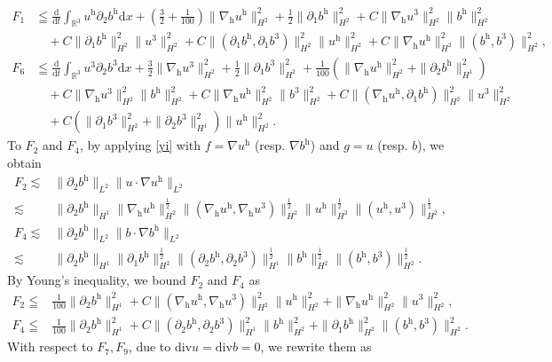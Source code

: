 \documentclass[11pt]{amsart}
\theoremstyle{definition}
\newcommand{\R}{\mathbb{R}}
\newcommand{\h}{\mathrm{h}}
\newcommand{\nablah}{\nabla_{\mathrm{h}}}
\numberwithin{equation}{section}
\begin{document}
\begin{align}\label{F1}
	F_1&\leqq\frac{\mathrm{d}}{\mathrm{d} t}\int_{\R^3} u^\h\partial_2 b^\h\mathrm{d} x+(\frac32+\frac{1}{100})\|\nablah u^\h\|_{H^2}^2+\frac12\|\partial_1 b^\h\|_{H^2}^2+C\|\nablah u^3\|_{H^2}^2\|b^\h\|_{H^2}^2\nonumber\\
	&\quad+C\|\partial_1 b^\h\|_{H^2}^2\| u^3\|_{H^2}^2+C\|(\partial_1b^\h,\partial_1b^3)\|_{H^2}^2\| u^\h\|_{H^2}^2+C\|\nablah u^\h\|_{H^2}^2\|(b^\h,b^3)\|_{H^2}^2,\\\label{F6}
	F_6&\leqq\frac{\mathrm{d}}{\mathrm{d} t}\int_{\R^3}u^3\partial_2 b^3\mathrm{d} x+\frac32\|\nablah u^3\|_{H^2}^2+\frac12\|\partial_1 b^3\|_{H^2}^2+\frac{1}{100}\left( \|\nablah u^\h\|_{H^2}^2+\|\partial_2 b^\h\|_{H^1}^2\right)\nonumber\\
	&\quad+C\|\nabla_\h u^3\|_{H^2}^2\|b^\h\|_{H^2}^2+C\|\nabla_\h u^\h\|_{H^2}^2\|b^3\|_{H^2}^2+C\|(\nablah u^\h,\partial_1 b^\h)\|_{H^2}^2\|u^3\|_{H^2}^2\nonumber\\
	&\quad+C\left(\|\partial_1 b^3\|_{H^2}^2+\|\partial_2 b^3\|_{H^1}^2\right)\|u^\h\|_{H^2}^2.
\end{align}
To $F_2$ and $F_4$, by applying \eqref{yi} with $f=\nabla u^\h$ (resp. $\nabla b^\h$) and $g=u$ (resp. $b$), we obtain
\begin{align}\label{f_2}
	F_2\lesssim &\|\partial_2 b^\h\|_{L^2}\|u\cdot \nabla u^\h\|_{L^2}\nonumber\\
	\lesssim &\|\partial_2 b^\h\|_{H^1}\|\nablah u^\h\|_{H^2}^\frac12\|(\nablah u^\h,\nablah u^3)\|_{H^2}^\frac12\| u^\h\|_{H^2}^\frac12\|( u^\h, u^3)\|_{H^2}^\frac12,\\
	\label{f_4}
	F_4\lesssim &\|\partial_2 b^\h\|_{L^2}\|b\cdot \nabla b^\h\|_{L^2}\nonumber\\
	\lesssim &\|\partial_2 b^\h\|_{H^1}\|\partial_1 b^\h\|_{H^2}^\frac12\|(\partial_2 b^\h,\partial_2 b^3)\|_{H^1}^\frac12\| b^\h\|_{H^2}^\frac12\|( b^\h, b^3)\|_{H^2}^\frac12.
\end{align}
By Young's inequality, we bound $F_2$ and $F_4$ as
\begin{align}\label{F2}
	F_2\leqq &\frac{1}{100} \|\partial_2 b^\h\|_{H^1}^2+C\|(\nablah u^\h,\nablah u^3)\|_{H^2}^2\| u^\h\|_{H^2}^2+\|\nablah u^\h\|_{H^2}^2\| u^3\|_{H^2}^2,\\\label{F4}
	F_4\leqq &\frac{1}{100} \|\partial_2 b^\h\|_{H^1}^2+C\|(\partial_2 b^\h,\partial_2 b^3)\|_{H^1}^2\| b^\h\|_{H^2}^2+\|\partial_1 b^\h\|_{H^2}^2\|( b^\h, b^3)\|_{H^2}^2.
\end{align}
With respect to $F_7,F_9$, due to $\mathrm{div} u=\mathrm{div} b=0$, we rewrite them as
\end{document}
